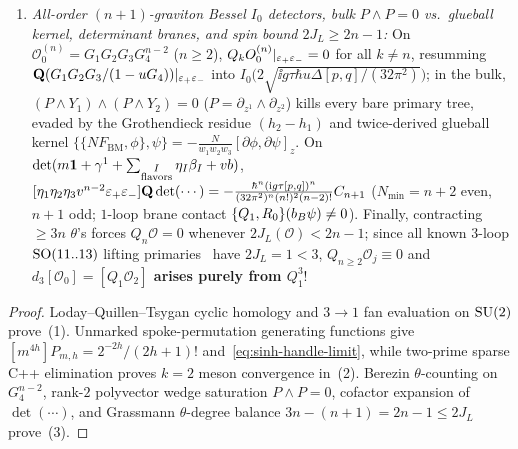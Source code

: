 \begin{theorem}[All-order finite-$N$ and nonplanar $4\mathrm{D}$ $\mathcal{N}=4$ twisted holography~{\cite{CG18,BG26,Repo9e833c8}}]
\begin{enumerate}[label=(\arabic*),leftmargin=*]
  \item \emph{All-order $(n+1)$-graviton Bessel $I_0$ detectors, bulk $P\wedge P=0$ vs.\ glueball kernel, determinant branes, and spin bound $2J_L \ge 2n-1$:} On $\mathcal{O}_0^{(n)} = G_1 G_2 G_3 G_4^{n-2}$ ($n \ge 2$), $Q_kO_0^{(n)}|_{\varepsilon_+\varepsilon_-} = 0$ for all $k \neq n$, resumming $\mathbf{Q}(G_1 G_2 G_3/(1-u G_4))|_{\varepsilon_+\varepsilon_-}$ into $I_0\!\bigl(2\sqrt{\ii g\tau\hbar u\Delta[p,q]/(32\pi^2)}\bigr)$; in the bulk, $(P\wedge Y_1)\wedge(P\wedge Y_2) = 0$ ($P = \partial_{z^1}\wedge\partial_{z^2}$) kills every bare primary tree, evaded by the Grothendieck residue $(h_2-h_1)$ and twice-derived glueball kernel $\{\{NF_{\mathrm{BM}},\phi\},\psi\} = -\frac{N}{w_1 w_2 w_3}[\partial\phi,\partial\psi]_z$. On $\det(m\mathbf{1}+\gamma^1+\sum_{\substack{I\\\mathrm{flavors}}}\eta_I\beta_I + vb)$, $[\eta_1\eta_2\eta_3 v^{n-2}\varepsilon_+\varepsilon_-]\mathbf{Q}\det(\cdots) = -\frac{\hbar^n(\mathrm{i} g\tau[p,q])^n}{(32\pi^2)^n(n!)^2(n-2)!}C_{n+1}$ ($N_{\min} = n+2$ even, $n+1$ odd; $1$-loop brane contact $\{Q_1,R_0\}(b_B\psi) \neq 0$). Finally, contracting $\ge 3n$ $\theta$'s forces $Q_n\mathcal{O} = 0$ whenever $2J_L(\mathcal{O}) < 2n-1$; since all known $3$-loop $\operatorname{SO}(11..13)$ lifting primaries~\cite{LLC} have $2J_L = 1 < 3$, $Q_{n\ge 2}\mathcal{O}_j \equiv 0$ and \textbf{$d_3[\mathcal{O}_0] = [Q_1\mathcal{O}_2]$ arises purely from $Q_1^3$}!
\end{enumerate}
\end{theorem}

\begin{proof}
Loday--Quillen--Tsygan cyclic homology and $3\to 1$ fan evaluation on $\operatorname{SU}(2)$ prove~(1). Unmarked spoke-permutation generating functions give $[m^{4h}]P_{m,h} = 2^{-2h}/(2h+1)!$ and~\eqref{eq:sinh-handle-limit}, while two-prime sparse C++ elimination proves $k=2$ meson convergence in~(2). Berezin $\theta$-counting on $G_4^{n-2}$, rank-$2$ polyvector wedge saturation $P\wedge P = 0$, cofactor expansion of $\det(\cdots)$, and Grassmann $\theta$-degree balance $3n - (n+1) = 2n-1 \le 2J_L$ prove~(3).
\end{proof}

